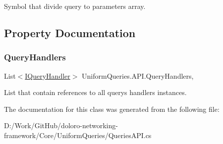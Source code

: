 Symbol that divide query to parameters array. 



\subsection{Property Documentation}
\mbox{\label{class_uniform_queries_1_1_a_p_i_a759098e511956b9afaaaf3ab13af336e}} 
\subsubsection{\texorpdfstring{Query\+Handlers}{QueryHandlers}}
{\footnotesize\ttfamily List$<$\mbox{\hyperlink{interface_uniform_queries_1_1_executable_1_1_i_query_handler}{I\+Query\+Handler}}$>$ Uniform\+Queries.\+A\+P\+I.\+Query\+Handlers\hspace{0.3cm}{\ttfamily [static]}, {\ttfamily [get]}}



List that contain references to all query\textquotesingle{}s handlers instances. 



The documentation for this class was generated from the following file\+:\begin{DoxyCompactItemize}
\item 
D\+:/\+Work/\+Git\+Hub/doloro-\/networking-\/framework/\+Core/\+Uniform\+Queries/Queries\+A\+P\+I.\+cs\end{DoxyCompactItemize}
